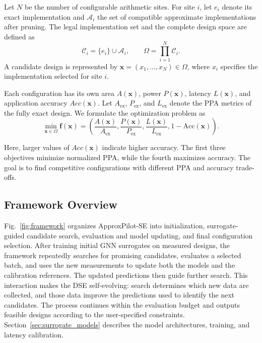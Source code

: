 Let $N$ be the number of configurable arithmetic sites. For site $i$, let $e_i$ denote its exact implementation and $\mathcal{A}_i$ the set of compatible approximate implementations after pruning. The legal implementation set and the complete design space are defined as
\begin{equation}
    \mathcal{C}_i = \{e_i\} \cup \mathcal{A}_i,
    \qquad
    \Omega = \prod_{i=1}^{N}\mathcal{C}_i.
    \label{eq:se_configuration_space}
\end{equation}
A candidate design is represented by $\mathbf{x}=(x_1,\ldots,x_N)\in\Omega$, where $x_i$ specifies the implementation selected for site $i$.

Each configuration has its own area $A(\mathbf{x})$, power $P(\mathbf{x})$, latency $L(\mathbf{x})$, and application accuracy $Acc(\mathbf{x})$. Let $A_{\mathrm{ex}}$, $P_{\mathrm{ex}}$, and $L_{\mathrm{ex}}$ denote the PPA metrics of the fully exact design. We formulate the optimization problem as
\begin{equation}
    \min_{\mathbf{x}\in\Omega}
    \mathbf{f}(\mathbf{x}) =
    \left(
        \frac{A(\mathbf{x})}{A_{\mathrm{ex}}},
        \frac{P(\mathbf{x})}{P_{\mathrm{ex}}},
        \frac{L(\mathbf{x})}{L_{\mathrm{ex}}},
        1-\mathrm{Acc}(\mathbf{x})
    \right).
    \label{eq:se_search_objectives}
\end{equation}

Here, larger values of $Acc(\mathbf{x})$ indicate higher accuracy. The first three objectives minimize normalized PPA, while the fourth maximizes accuracy. The goal is to find competitive configurations with different PPA and accuracy trade-offs.
















\subsection{Framework Overview}
\label{subsec:framework_overview}

Fig.~\ref{fig:framework} organizes ApproxPilot-SE into initialization, surrogate-guided candidate search, evaluation and model updating, and final configuration selection. After training initial GNN surrogates on measured designs, the framework repeatedly searches for promising candidates, evaluates a selected batch, and uses the new measurements to update both the models and the calibration references. The updated predictions then guide further search. This interaction makes the DSE self-evolving: search determines which new data are collected, and those data improve the predictions used to identify the next candidates. The process continues within the evaluation budget and outputs feasible designs according to the user-specified constraints. Section~\ref{sec:surrogate_models} describes the model architectures, training, and latency calibration.

